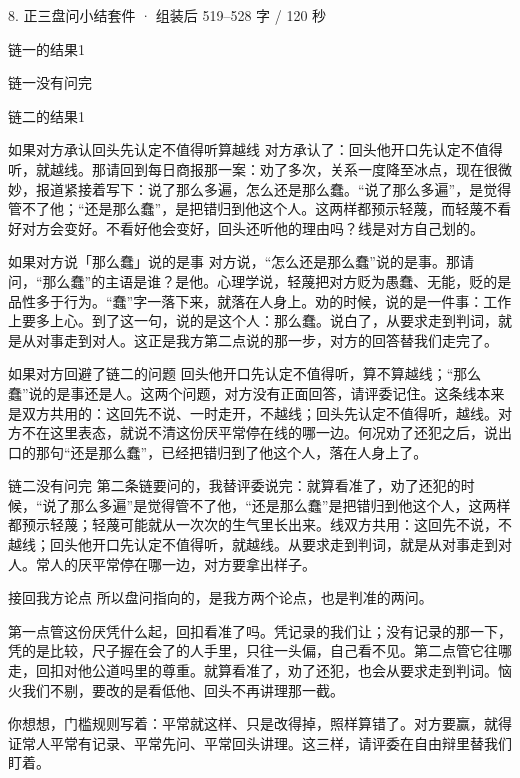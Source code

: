 \documentclass[script,pro]{debate}
\begin{document}
\begin{kit}{8. 正三盘问小结}{套件 · 组装后 519–528 字 / 120 秒}
\begin{pick}{链一的结果}{1}
\begin{fallback}{链一没有问完}
\end{fallback}
\end{pick}
\begin{pick}{链二的结果}{1}
\begin{module}{如果对方承认回头先认定不值得听算越线}
对方承认了：回头他开口先认定不值得听，就越线。那请回到每日商报那一案：劝了多次，关系一度降至冰点，现在很微妙，报道紧接着写下：说了那么多遍，怎么还是那么蠢。“说了那么多遍”，是觉得管不了他；“还是那么蠢”，是把错归到他这个人。这两样都预示轻蔑，而轻蔑不看好对方会变好。不看好他会变好，回头还听他的理由吗？线是对方自己划的。
\end{module}
\begin{module}{如果对方说「那么蠢」说的是事}
对方说，“怎么还是那么蠢”说的是事。那请问，“那么蠢”的主语是谁？是他。心理学说，轻蔑把对方贬为愚蠢、无能，贬的是品性多于行为。“蠢”字一落下来，就落在人身上。劝的时候，说的是一件事：工作上要多上心。到了这一句，说的是这个人：那么蠢。说白了，从要求走到判词，就是从对事走到对人。这正是我方第二点说的那一步，对方的回答替我们走完了。
\end{module}
\begin{module}{如果对方回避了链二的问题}
回头他开口先认定不值得听，算不算越线；“那么蠢”说的是事还是人。这两个问题，对方没有正面回答，请评委记住。这条线本来是双方共用的：这回先不说、一时走开，不越线；回头先认定不值得听，越线。对方不在这里表态，就说不清这份厌平常停在线的哪一边。何况劝了还犯之后，说出口的那句“还是那么蠢”，已经把错归到了他这个人，落在人身上了。
\end{module}
\begin{fallback}{链二没有问完}
第二条链要问的，我替评委说完：就算看准了，劝了还犯的时候，“说了那么多遍”是觉得管不了他，“还是那么蠢”是把错归到他这个人，这两样都预示轻蔑；轻蔑可能就从一次次的生气里长出来。线双方共用：这回先不说，不越线；回头他开口先认定不值得听，就越线。从要求走到判词，就是从对事走到对人。常人的厌平常停在哪一边，对方要拿出样子。
\end{fallback}
\end{pick}
\begin{fixed}{接回我方论点}
所以盘问指向的，是我方两个论点，也是判准的两问。

第一点管这份厌凭什么起，回扣看准了吗。凭记录的我们让；没有记录的那一下，凭的是比较，尺子握在会了的人手里，只往一头偏，自己看不见。第二点管它往哪走，回扣对他公道吗里的尊重。就算看准了，劝了还犯，也会从要求走到判词。恼火我们不剔，要改的是看低他、回头不再讲理那一截。

你想想，门槛规则写着：平常就这样、只是改得掉，照样算错了。对方要赢，就得证常人平常有记录、平常先问、平常回头讲理。这三样，请评委在自由辩里替我们盯着。
\end{fixed}
\end{kit}
\end{document}

